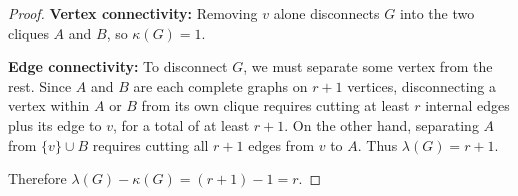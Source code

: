 \documentclass[12pt]{article}
\begin{document}
\begin{enumerate}
\begin{proof}
\textbf{Vertex connectivity:} Removing $v$ alone disconnects $G$ into the two cliques $A$ and $B$, so $\kappa(G) = 1$.

\textbf{Edge connectivity:} To disconnect $G$, we must separate some vertex from the rest. Since $A$ and $B$ are each complete graphs on $r+1$ vertices, disconnecting a vertex within $A$ or $B$ from its own clique requires cutting at least $r$ internal edges plus its edge to $v$, for a total of at least $r+1$. On the other hand, separating $A$ from $\{v\} \cup B$ requires cutting all $r+1$ edges from $v$ to $A$. Thus $\lambda(G) = r + 1$.

Therefore $\lambda(G) - \kappa(G) = (r+1) - 1 = r$.
\end{proof}
\end{enumerate}
\end{document}
